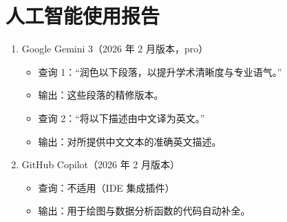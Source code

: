 \documentclass[11pt,a4paper]{ctexart}
\begin{document}
\section*{人工智能使用报告}

\begin{enumerate}[leftmargin=1.8em,itemsep=0.3em]
\item Google Gemini 3（2026 年 2 月版本，pro）
\begin{itemize}[leftmargin=1.4em,itemsep=0.1em]
\item 查询 1：“润色以下段落，以提升学术清晰度与专业语气。”
\item 输出：这些段落的精修版本。
\item 查询 2：“将以下描述由中文译为英文。”
\item 输出：对所提供中文文本的准确英文描述。
\end{itemize}
\item GitHub Copilot（2026 年 2 月版本）
\begin{itemize}[leftmargin=1.4em,itemsep=0.1em]
\item 查询：不适用（IDE 集成插件）
\item 输出：用于绘图与数据分析函数的代码自动补全。
\end{itemize}
\end{enumerate}
\end{document}
